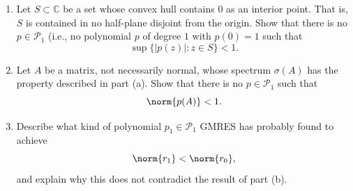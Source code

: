 \documentclass{ctexart}
\begin{document}
\begin{problem}\label{pro:6}
  \begin{enumerate}[label=(\alph*)]
    \item Let \(S \subset \mathbb{C}\) be a set whose convex hull contains \(0\) as an interior point. That is,
      \(S\) is contained in no half-plane disjoint from the origin.
      Show that there is no \(p \in \mathcal{P}_1\) (i.e., no polynomial \(p\) of degree \(1\) with \(p(0)=1\) such that
        \[
          \sup\{ |p(z)| : z \in S \} < 1.
        \]

      \item Let \(A\) be a matrix, not necessarily normal, whose spectrum \(\sigma(A)\) has the property described in part (a). Show that there is no \(p \in \mathcal{P}_1\) such that
        \[
          \norm{p(A)} < 1.
        \]

      \item Describe what kind of polynomial \(p_1 \in \mathcal{P}_1\) GMRES has probably found to achieve
        \[
          \norm{r_1} < \norm{r_0},
        \]
        and explain why this does not contradict the result of part (b).
    \end{enumerate}
  \end{problem}
\end{document}

